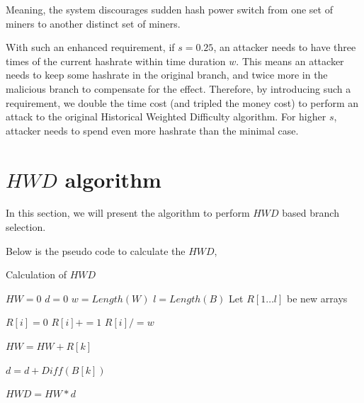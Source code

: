 \documentclass[conference]{IEEEtran}
\begin{document}
Meaning, the system discourages sudden hash power switch from one set of miners to another distinct set of miners.

With such an enhanced requirement, if $s=0.25$, an attacker needs to have three times of the current hashrate within time duration $w$. This means an attacker needs to keep some hashrate in the original branch, and twice more in the malicious branch to compensate for the effect. Therefore, by introducing such a requirement, we double the time cost (and tripled the money cost) to perform an attack to the original Historical Weighted Difficulty algorithm. For higher $s$, attacker needs to spend even more hashrate than the minimal case. 

\section{$H\!W\!D$ algorithm}
In this section, we will present the algorithm to perform $H\!W\!D$ based branch selection.

Below is the pseudo code to calculate the $H\!W\!D$,

\makeatletter
\def\BState{\State\hskip-\ALG@thistlm}
\makeatother

\begin{algorithm}
\caption{Calculation of $H\!W\!D$}\label{euclid}
\begin{algorithmic}[1]
    \State ${H\!W} = 0$
    \State $d = 0$
    \State $w = Length(W)$
    \State $l = Length(B)$
    \State Let $R[1 \ldots l]$ be new arrays
    
        \State $R[i] = 0$
                \State $R[i] += 1$
            \EndIf
            \State $R[i] /= w$
        \EndFor
    \EndFor

        \State ${H\!W} = {H\!W} + R[k]$
    \EndFor

        \State $d = d + Diff(B[k])$
    \EndFor

    \State ${H\!W\!D} = {H\!W} * d$
\EndFunction
\end{algorithmic}
\end{algorithm}
\end{document}
